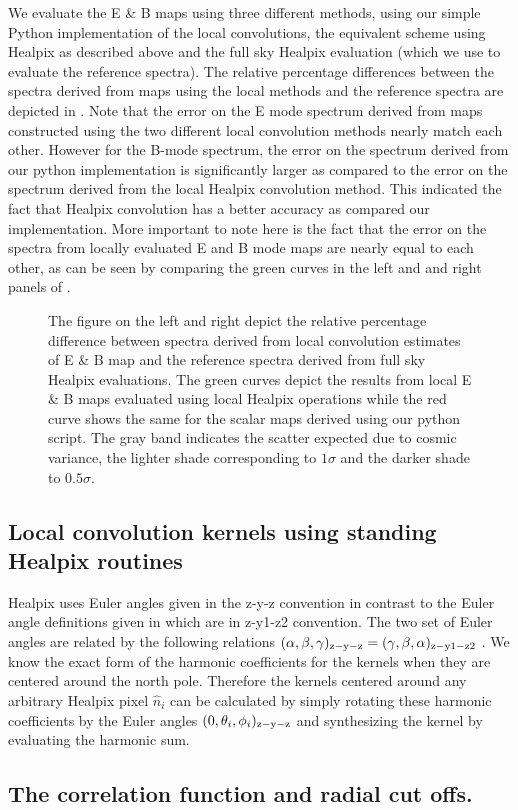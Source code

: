 We evaluate the E \& B maps using three different methods,  using our simple Python implementation of the local convolutions, the equivalent scheme using Healpix as described above and the full sky Healpix evaluation (which we use to evaluate the reference spectra). The relative percentage differences between the spectra derived from maps using the local methods and the reference spectra are depicted in . Note that the error on the E mode spectrum derived from maps constructed using the two different local convolution methods nearly match each other. However for the B-mode spectrum, the error on the spectrum derived from our python implementation is significantly larger as compared to the error on the spectrum derived from the local Healpix convolution method. This indicated the fact that Healpix convolution has a better accuracy as compared our implementation. More important to note here is the fact that the error on the spectra from locally evaluated E and B mode maps are nearly equal to each other, as can be seen by comparing the green curves in the left and and right panels of .
%
\begin{figure}[!h] 
\centering
{}
\caption{The figure on the left and right depict the relative percentage difference between spectra derived from local convolution estimates of E \& B map and the reference spectra derived from full sky Healpix evaluations. The green curves depict the results from local E \& B maps evaluated using local Healpix operations while the red curve shows the same for the scalar maps derived using our python script. The gray band indicates the scatter expected due to cosmic variance, the lighter shade corresponding to $1\sigma$ and the darker shade to $0.5 \sigma$. }
\label{fig:convolution-err}
\end{figure}
%

\subsection{Local convolution kernels using standing Healpix routines}\label{sec:rot_ker_healpix}
Healpix uses Euler angles given in the z-y-z convention in contrast to the Euler angle definitions given in  which are in z-y1-z2 convention. The two set of Euler angles are related by the following relations $(\alpha,\beta,\gamma)_{\rm z-y-z} = (\gamma,\beta,\alpha)_{\rm z-y1-z2}$ \cite{varshalovich}. We know the exact form of the harmonic coefficients for the kernels when they are centered around the north pole. Therefore the kernels centered around any arbitrary Healpix pixel $\hat{n}_i$ can be calculated by simply rotating these harmonic coefficients by the Euler angles $(0,\theta_i,\phi_i)_{\rm z-y-z}$ and synthesizing the kernel by evaluating the harmonic sum.
\subsection{The correlation function and radial cut offs.}\label{sec:corrfn_rad_cutoff}
